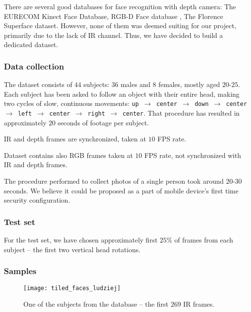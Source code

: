     There are several good databases for face recognition with depth camera:
    The EURECOM Kinect Face Database\cite{eurecom},
    RGB-D Face database \cite{vapaaudk},
    The Florence Superface dataset\cite{superface}. However, none of them was
    deemed suiting for our project, primarily due to the lack of IR channel.
    Thus, we have decided to build a dedicated dataset.

    \subsubsection*{Data collection}
    The dataset consists of $44$ subjects: $36$ males and
    $8$ females, mostly aged $20$-$25$. Each subject has been asked to
    follow an object with their entire head, making two cycles of slow,
    continuous movements: \texttt{up $\to$ center $\to$ down $\to$ center $\to$
    left $\to$ center $\to$ right $\to$ center}.
    That procedure has resulted in approximately $20$ seconds of footage per
    subject.

    IR and depth frames are synchronized, taken at $10$ FPS rate.

    Dataset contains also RGB frames taken at $10$ FPS rate, not synchronized
    with IR and depth frames.

    The procedure performed to collect photos of a single person took around $20$-$30$ seconds.
    We believe it could be proposed as a part of mobile device's first time security configuration.

    \subsubsection*{Test set}
    For the test set, we have chosen approximately first $25\%$ of
    frames from each subject -- the first two vertical head rotations.

    \subsubsection*{Samples}
    \begin{figure}[H]
    \caption{One of the subjects from the database -- the first $269$ IR frames.}
    \centering
    \texttt{[image: tiled\_faces\_ludziej]}
    \end{figure}

